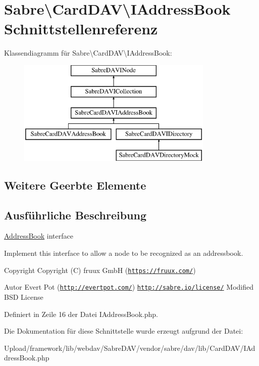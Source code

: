 \hypertarget{interface_sabre_1_1_card_d_a_v_1_1_i_address_book}{}\section{Sabre\textbackslash{}Card\+D\+AV\textbackslash{}I\+Address\+Book Schnittstellenreferenz}
\label{interface_sabre_1_1_card_d_a_v_1_1_i_address_book}
Klassendiagramm für Sabre\textbackslash{}Card\+D\+AV\textbackslash{}I\+Address\+Book\+:\begin{figure}[H]
\begin{center}
\leavevmode
\includegraphics[height=5.000000cm]{interface_sabre_1_1_card_d_a_v_1_1_i_address_book}
\end{center}
\end{figure}
\subsection*{Weitere Geerbte Elemente}


\subsection{Ausführliche Beschreibung}
\mbox{\hyperlink{class_sabre_1_1_card_d_a_v_1_1_address_book}{Address\+Book}} interface

Implement this interface to allow a node to be recognized as an addressbook.

\begin{DoxyCopyright}{Copyright}
Copyright (C) fruux GmbH (\href{https://fruux.com/}{\tt https\+://fruux.\+com/}) 
\end{DoxyCopyright}
\begin{DoxyAuthor}{Autor}
Evert Pot (\href{http://evertpot.com/}{\tt http\+://evertpot.\+com/})  \href{http://sabre.io/license/}{\tt http\+://sabre.\+io/license/} Modified B\+SD License 
\end{DoxyAuthor}


Definiert in Zeile 16 der Datei I\+Address\+Book.\+php.



Die Dokumentation für diese Schnittstelle wurde erzeugt aufgrund der Datei\+:\begin{DoxyCompactItemize}
\item 
Upload/framework/lib/webdav/\+Sabre\+D\+A\+V/vendor/sabre/dav/lib/\+Card\+D\+A\+V/I\+Address\+Book.\+php\end{DoxyCompactItemize}
